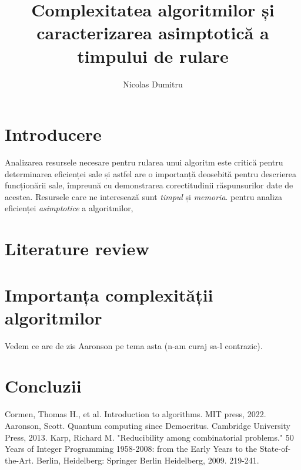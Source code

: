 \documentclass{article}
\title{Complexitatea algoritmilor și caracterizarea asimptotică a timpului de rulare}
\author{Nicolas Dumitru}
\begin{document}
\maketitle

\tableofcontents

\section{Introducere}
Analizarea resursele necesare pentru rularea unui algoritm este critică pentru
determinarea eficienței sale și astfel are o importanță deosebită pentru
descrierea funcționării sale, împreună cu demonstrarea corectitudinii
răspunsurilor date de acestea. Resursele care ne interesează sunt \emph{timpul}
și \emph{memoria}.
pentru analiza eficienței \emph{asimptotice} a algoritmilor,

\section{Literature review} %

\section{Importanța complexității algoritmilor}
Vedem ce are de zis Aaronson pe tema asta (n-am curaj sa-l contrazic).

\section{Concluzii}

\begin{thebibliography}{ }
	Cormen, Thomas H., et al. Introduction to algorithms. MIT press, 2022.
	Aaronson, Scott. Quantum computing since Democritus. Cambridge University Press, 2013.
	Karp, Richard M. "Reducibility among combinatorial problems." 50 Years of Integer Programming 1958-2008: from the Early Years to the State-of-the-Art. Berlin, Heidelberg: Springer Berlin Heidelberg, 2009. 219-241.
\end{thebibliography}
\end{document}
